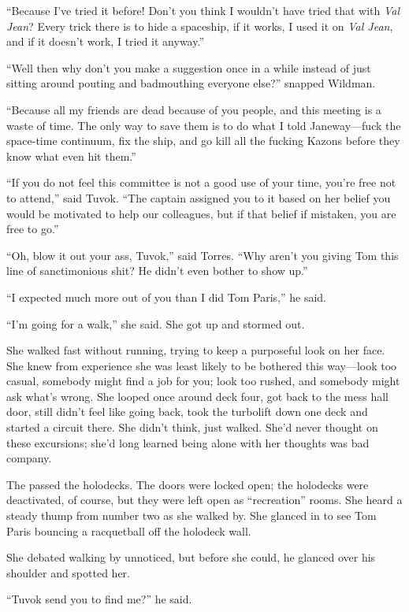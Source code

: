 \documentclass[twoside,letterpaper,12pt]{memoir}
\begin{document}
``Because I've tried it before! Don't you think I wouldn't have tried that with \textit{Val Jean}? Every trick there is to hide a spaceship, if it works, I used it on \textit{Val Jean}, and if it doesn’t work, I tried it anyway.'' 

``Well then why don't you make a suggestion once in a while instead of just sitting around pouting and badmouthing everyone else?'' snapped Wildman. 

``Because all my friends are dead because of you people, and this meeting is a waste of time. The only way to save them is to do what I told Janeway---fuck the space-time continuum, fix the ship, and go kill all the fucking Kazons before they know what even hit them.'' 

``If you do not feel this committee is not a good use of your time, you're free not to attend,'' said Tuvok. ``The captain assigned you to it based on her belief you would be motivated to help our colleagues, but if that belief if mistaken, you are free to go.'' 

``Oh, blow it out your ass, Tuvok,'' said Torres. ``Why aren't you giving Tom this line of sanctimonious shit? He didn't even bother to show up.'' 

``I expected much more out of you than I did Tom Paris,'' he said. 

``I'm going for a walk,'' she said. She got up and stormed out. 

She walked fast without running, trying to keep a purposeful look on her face. She knew from experience she was least likely to be bothered this way---look too casual, somebody might find a job for you; look too rushed, and somebody might ask what's wrong. She looped once around deck four, got back to the mess hall door, still didn't feel like going back, took the turbolift down one deck and started a circuit there. She didn't think, just walked. She'd never thought on these excursions; she'd long learned being alone with her thoughts was bad company. 

The passed the holodecks. The doors were locked open; the holodecks were deactivated, of course, but they were left open as ``recreation'' rooms. She heard a steady thump from number two as she walked by. She glanced in to see Tom Paris bouncing a racquetball off the holodeck wall. 

She debated walking by unnoticed, but before she could, he glanced over his shoulder and spotted her. 

``Tuvok send you to find me?'' he said. 
\end{document}
